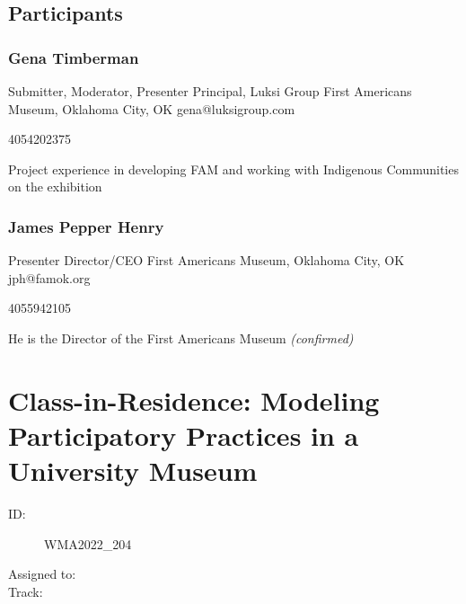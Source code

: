 \documentclass{report}
\begin{document}
            \subsection*{Participants}
              \subsubsection*{ Gena Timberman }
              Submitter, Moderator, Presenter\newline
              Principal, Luksi Group\newline
              First Americans Museum, Oklahoma City, OK
              \newline
              gena@luksigroup.com\newline
              
              4054202375\newline

              Project experience in developing FAM and working with Indigenous Communities on the exhibition\newline


              

              
                \subsubsection*{ James Pepper Henry }
                Presenter\newline
                Director/CEO \newline
                First Americans Museum, Oklahoma City, OK
                \newline
                jph@famok.org\newline
                
                4055942105\newline

                He is the Director of the First Americans Museum
                \emph{ (confirmed) }
              

              

              

              
        
          \newpage
          \section{ Class-in-Residence: Modeling Participatory Practices in a University Museum }
            \begin{description}
              \item [ID:]
              WMA2022\_204

              \item [Assigned to:]
                \item [Track:]
              \end{description}
\end{document}
